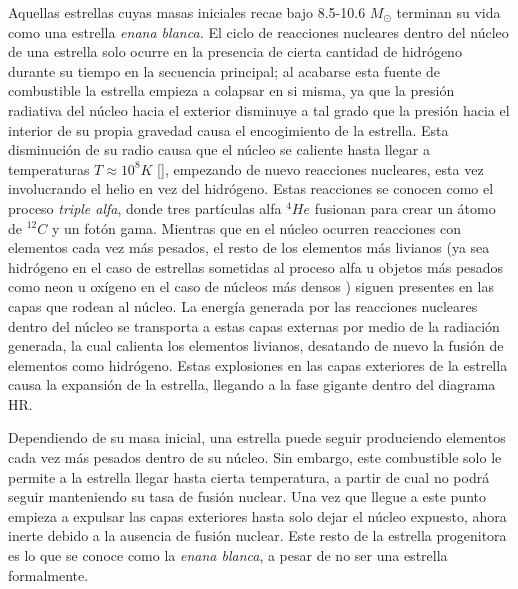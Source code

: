 Aquellas estrellas cuyas masas iniciales recae bajo 8.5-10.6 \(M_{\odot}\)
terminan su vida como una estrella \textit{enana blanca.}
\citet*{whiteDwarfsReview} El ciclo de reacciones nucleares dentro del núcleo de
una estrella solo ocurre en la presencia de cierta cantidad de hidrógeno durante
su tiempo en la secuencia principal; al acabarse esta fuente de combustible la
estrella empieza a colapsar en si misma, ya que la presión radiativa del núcleo
hacia el exterior disminuye a tal grado que la presión hacia el interior de su
propia gravedad causa el encogimiento de la estrella. Esta disminución de su
radio causa que el núcleo se caliente hasta llegar a temperaturas \(T \approx
10^{8} K\) [\citet*{astronomyPhysicalPerspective_stellarOldAgeChapter}],
empezando de nuevo reacciones nucleares, esta vez involucrando el helio en vez
del hidrógeno. Estas reacciones se conocen como el proceso \textit{triple alfa},
donde tres partículas alfa \(^{4}He\) fusionan para crear un átomo de \(^{12}C\)
y un fotón gama. Mientras que en el núcleo ocurren reacciones con elementos cada
vez más pesados, el resto de los elementos más livianos (ya sea hidrógeno en el
caso de estrellas sometidas al proceso alfa u objetos más pesados como neon u
oxígeno en el caso de núcleos más densos
\citet*{astronomyPhysicalPerspective_stellarOldAgeChapter}) siguen presentes en
las capas que rodean al núcleo. La energía generada por las reacciones nucleares
dentro del núcleo se transporta a estas capas externas por medio de la radiación
generada, la cual calienta los elementos livianos, desatando de nuevo la fusión
de elementos como hidrógeno. Estas explosiones en las capas exteriores de la
estrella causa la expansión de la estrella, llegando a la fase gigante dentro
del diagrama HR.

Dependiendo de su masa inicial, una estrella puede seguir produciendo elementos
cada vez más pesados dentro de su núcleo. Sin embargo, este combustible solo le
permite a la estrella llegar hasta cierta temperatura, a partir de cual no podrá
seguir manteniendo su tasa de fusión nuclear. Una vez que llegue a este punto
empieza a expulsar las capas exteriores hasta solo dejar el núcleo expuesto,
ahora inerte debido a la ausencia de fusión nuclear. Este resto de la estrella
progenitora es lo que se conoce como la \textit{enana blanca}, a pesar de no ser
una estrella formalmente.